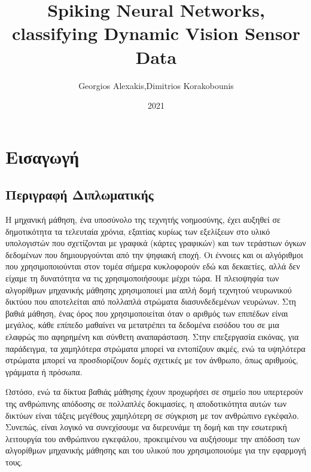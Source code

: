 \documentclass[12pt]{report}
\title{Spiking Neural Networks, classifying Dynamic Vision Sensor Data }
\author{Georgios Alexakis,Dimitrios Korakobounis}
\date{2021}
\begin{document}
\maketitle
{}
\tableofcontents{}
\chapter{Εισαγωγή}

\section{Περιγραφή Διπλωματικής}
Η μηχανική μάθηση, ένα υποσύνολο της τεχνητής νοημοσύνης, έχει αυξηθεί σε δημοτικότητα τα τελευταία χρόνια, εξαιτίας κυρίως των εξελίξεων στο υλικό υπολογιστών που σχετίζονται με γραφικά (κάρτες γραφικών) και των τεράστιων όγκων δεδομένων που δημιουργούνται από την ψηφιακή εποχή. Οι έννοιες και οι αλγόριθμοι που χρησιμοποιούνται στον τομέα σήμερα κυκλοφορούν εδώ και δεκαετίες, αλλά δεν είχαμε τη δυνατότητα να τις χρησιμοποιήσουμε μέχρι τώρα. Η πλειοψηφία των αλγορίθμων μηχανικής μάθησης χρησιμοποιεί μια απλή δομή τεχνητού νευρωνικού δικτύου που αποτελείται από πολλαπλά στρώματα διασυνδεδεμένων νευρώνων. Στη βαθιά μάθηση, ένας όρος που χρησιμοποιείται όταν ο αριθμός των επιπέδων είναι μεγάλος, κάθε επίπεδο μαθαίνει να μετατρέπει τα δεδομένα εισόδου του σε μια ελαφρώς πιο αφηρημένη και σύνθετη αναπαράσταση. Στην επεξεργασία εικόνας, για παράδειγμα, τα χαμηλότερα στρώματα μπορεί να εντοπίζουν ακμές, ενώ τα υψηλότερα στρώματα μπορεί να προσδιορίζουν δομές σχετικές με τον άνθρωπο, όπως αριθμούς, γράμματα ή πρόσωπα.  

Ωστόσο, ενώ τα δίκτυα βαθιάς μάθησης έχουν προχωρήσει σε σημείο που υπερτερούν της ανθρώπινης απόδοσης σε πολλαπλές δοκιμασίες, η αποδοτικότητα αυτών των δικτύων είναι τάξεις μεγέθους χαμηλότερη σε σύγκριση με τον ανθρώπινο εγκέφαλο. Συνεπώς, είναι λογικό να συνεχίσουμε να διερευνάμε τη δομή και την εσωτερική λειτουργία του ανθρώπινου εγκεφάλου, προκειμένου να αυξήσουμε την απόδοση των αλγορίθμων μηχανικής μάθησης και του υλικού που χρησιμοποιούμε για την εφαρμογή τους.
\end{document}
